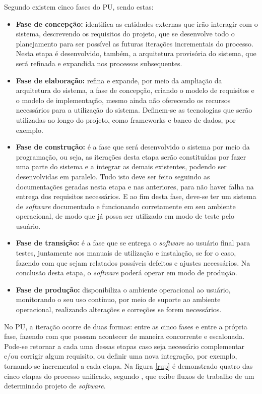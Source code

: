 Segundo  existem cinco fases do PU, sendo estas:
\begin{itemize}
    \item \textbf{Fase de concepção: }identifica as entidades externas que irão interagir com o sistema, descrevendo os requisitos do projeto, que se desenvolve todo o planejamento para ser possível as futuras iterações incrementais do processo. Nesta etapa é desenvolvido, também, a arquitetura provisória do sistema, que será refinada e expandida nos processos subsequentes.
    \item \textbf{Fase de elaboração: }refina e expande, por meio da ampliação da arquitetura do sistema, a fase de concepção, criando o modelo de requisitos e o modelo de implementação, mesmo ainda não oferecendo os recursos necessários para a utilização do sistema. Definem-se as tecnologias que serão utilizadas ao longo do projeto, como frameworks e banco de dados, por exemplo.
    \item \textbf{Fase de construção: }é a fase que será desenvolvido o sistema por meio da programação, ou seja, as iterações desta etapa serão constituídas por fazer uma parte do sistema e a integrar as demais existentes, podendo ser desenvolvidas em paralelo. Tudo isto deve ser feito seguindo as documentações geradas nesta etapa e nas anteriores, para não haver falha na entrega dos requisitos necessários. E ao fim desta fase, deve-se ter um sistema de \textit{software} documentado e funcionando corretamente em seu ambiente operacional, de modo que já possa ser utilizado em modo de teste pelo usuário.
    \item \textbf{Fase de transição: }é a fase que se entrega o \textit{software} ao usuário final para testes, juntamente aos manuais de utilização e instalação, se for o caso, fazendo com que sejam relatados possíveis defeitos e ajustes necessários. Na conclusão desta etapa, o \textit{software} poderá operar em modo de produção.
    \item \textbf{Fase de produção: }disponibiliza o ambiente operacional ao usuário, monitorando o seu uso contínuo, por meio de suporte ao ambiente operacional, realizando alterações e correções se forem necessários.
\end{itemize}

No PU, a iteração ocorre de duas formas: entre as cinco fases e entre a própria fase, fazendo com que possam acontecer de maneira concorrente e escalonada. Pode-se retornar a cada uma dessas etapas caso seja necessário complementar e/ou corrigir algum requisito, ou definir uma nova integração, por exemplo, tornando-se incremental a cada etapa. Na figura \ref{rup} é demonstrado quatro das cinco etapas do processo unificado, segundo , que exibe fluxos de trabalho de um determinado projeto de \textit{software}. 

